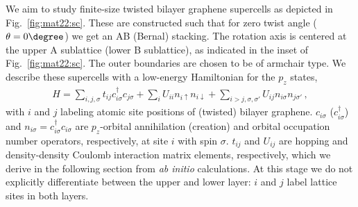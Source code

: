 We aim to study finite-size twisted bilayer graphene supercells as depicted in Fig.~\ref{fig:mat22:sc}. These are constructed such that for zero twist angle ($\theta=0\degree$) we get an AB (Bernal) stacking. The rotation axis is centered at the upper A sublattice (lower B sublattice), as indicated in the inset of Fig.~\ref{fig:mat22:sc}. The outer boundaries are chosen to be of armchair type. We describe these supercells with a low-energy Hamiltonian for the $p_z$ states,
\begin{align}\label{eq:mat22:hamiltonian}
    H = \sum_{i,j,\sigma} t_{ij} c_{i\sigma}^\dagger c_{j\sigma}
      + \sum_{i} U_{ii} n_{i\uparrow} n_{i\downarrow}
      + \sum_{i>j,\sigma, \sigma'} U_{ij} n_{i\sigma} n_{j\sigma'}\,,
\end{align}
with $i$ and $j$ labeling atomic site positions of (twisted) bilayer graphene. $c_{i\sigma}$ ($c_{i\sigma}^\dagger$) and $n_{i\sigma} = c_{i\sigma}^\dagger c_{i\sigma}$ are $p_z$-orbital annihilation (creation) and orbital occupation number operators, respectively, at site $i$ with spin $\sigma$. $t_{ij}$ and $U_{ij}$ are hopping and density-density Coulomb interaction matrix elements, respectively, which we derive in the following section from \textit{ab initio} calculations. At this stage we do not explicitly differentiate between the upper and lower layer: $i$ and $j$ label lattice sites in both layers. 

